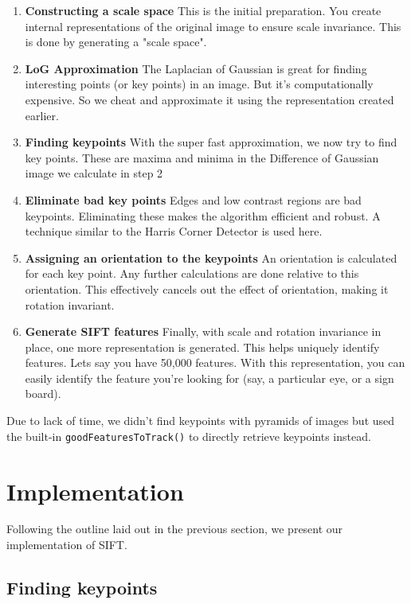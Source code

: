 \documentclass{ee208report}
\begin{document}
\begin{multicols*}{2}
\begin{enumerate}
    \item \textbf{Constructing a scale space} This is the initial preparation.
    You create internal representations of the original image to ensure scale
    invariance. This is done by generating a "scale space".
    \item \textbf{LoG Approximation} The Laplacian of Gaussian is great for
    finding interesting points (or key points) in an image. But it's
    computationally expensive. So we cheat and approximate it using the
    representation created earlier.
    \item \textbf{Finding keypoints} With the super fast approximation, we now
    try to find key points. These are maxima and minima in the Difference of
    Gaussian image we calculate in step 2
    \item \textbf{Eliminate bad key points} Edges and low contrast regions are
    bad keypoints. Eliminating these makes the algorithm efficient and robust. A
    technique similar to the Harris Corner Detector is used here.
    \item \textbf{Assigning an orientation to the keypoints} An orientation is
    calculated for each key point. Any further calculations are done relative to
    this orientation. This effectively cancels out the effect of orientation,
    making it rotation invariant.
    \item \textbf{Generate SIFT features} Finally, with scale and rotation
    invariance in place, one more representation is generated. This helps
    uniquely identify features. Lets say you have 50,000 features. With this
    representation, you can easily identify the feature you're looking for
    (say, a particular eye, or a sign board).
\end{enumerate}

Due to lack of time, we didn't find keypoints with pyramids of images but used
the built-in \texttt{goodFeaturesToTrack()} to directly retrieve keypoints
instead.

\section{Implementation}

Following the outline laid out in the previous section, we present our
implementation of SIFT.

\subsection{Finding keypoints}


\end{multicols*}
\end{document}
